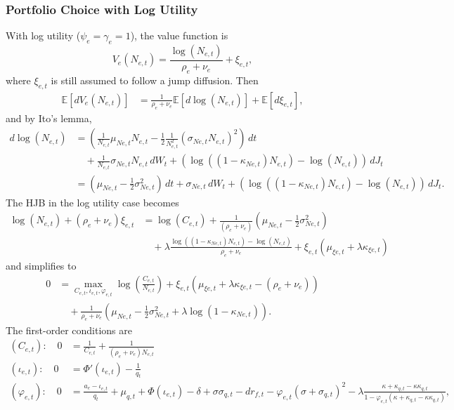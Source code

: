 \documentclass[12 pt, oneside]{article}
\theoremstyle{definition}
\theoremstyle{definition}
\theoremstyle{definition}
\newcommand{\E}{\mathbb{E}}
\begin{document}
\subsubsection{Portfolio Choice with Log Utility}
With log utility ($\psi_e = \gamma_e = 1$), the value function is
\begin{equation}
  \label{eq:value function log utility}
  V_e(N_{e, t}) = \frac{\log(N_{e, t})}{\rho_e + \nu_e} + \xi_{e, t},
\end{equation}
where $\xi_{e, t}$ is still assumed to follow a jump diffusion. Then
\begin{align*}
  \E[dV_e(N_{e, t})] & = \frac{1}{\rho_e + \nu_e}\E[d\log(N_{e, t})] + \E[d\xi_{e, t}],
\end{align*}
and by Ito's lemma,
\begin{align*}
d\log(N_{e, t}) & = \left(\frac{1}{N_{e, t}}\mu_{Ne, t}N_{e, t} - \frac{1}{2}\frac{1}{N_{e, t}^2}(\sigma_{Ne, t}N_{e, t})^2\right)\,dt\\
                &\quad + \frac{1}{N_{e, t}}\sigma_{Ne, t} N_{e, t}\, dW_t + (\log((1 - \kappa_{Ne, t})N_{e, t}) - \log(N_{e, t}))\, dJ_t\\
                & = \left(\mu_{Ne, t} - \frac{1}{2}\sigma_{Ne, t}^2\right)\,dt + \sigma_{Ne, t}\, dW_t + (\log((1 - \kappa_{Ne, t})N_{e, t}) - \log(N_{e, t}))\, dJ_t.
\end{align*}
The HJB in the log utility case becomes
\begin{align*}
    \log(N_{e, t}) + (\rho_e + \nu_e) \xi_{e, t} & = \log(C_{e, t}) + \frac{1}{(\rho_e + \nu_e)}\left(\mu_{Ne, t} - \frac{1}{2}\sigma_{Ne, t}^2\right)\\
                                                 &\quad + \lambda\frac{\log((1 - \kappa_{Ne, t})N_{e, t}) - \log(N_{e, t}) }{\rho_e + \nu_e} + \xi_{e, t}(\mu_{\xi e, t} + \lambda \kappa_{\xi e, t})
\end{align*}
and simplifies to
\begin{equation}
  \label{eq:hjb log utility}
  \begin{split}
  0 & = \max_{C_{e, t}, \iota_{e, t}, \varphi_{e, t}}\log\left(\frac{C_{e, t}}{N_{e, t}}\right)  + \xi_{e, t}(\mu_{\xi e, t} + \lambda \kappa_{\xi e, t} - (\rho_e + \nu_e))\\
  &\quad + \frac{1}{\rho_e + \nu_e}\left(\mu_{Ne, t}  - \frac{1}{2} \sigma_{Ne, t}^2 + \lambda\log(1 - \kappa_{Ne, t})\right).
  \end{split}
\end{equation}
The first-order conditions are
\begin{align*}
  (C_{e, t}):\quad 0 & = \frac{1}{C_{e, t}} + \frac{1}{(\rho_e + \nu_e)N_{e, t}}\\
  (\iota_{e, t}):\quad 0 & = \Phi'(\iota_{e, t}) - \frac{1}{q_t}\\
  (\varphi_{e, t}):\quad 0 & = \frac{a_e - \iota_{e, t}}{q_t} + \mu_{q, t} + \Phi(\iota_{e, t}) - \delta + \sigma\sigma_{q, t} - dr_{f, t} - \varphi_{e, t}(\sigma + \sigma_{q, t})^2 - \lambda\frac{\kappa + \kappa_{q, t} - \kappa\kappa_{q, t}}{1 - \varphi_{e, t}(\kappa + \kappa_{q, t} - \kappa\kappa_{q, t})},
\end{align*}
\end{document}
